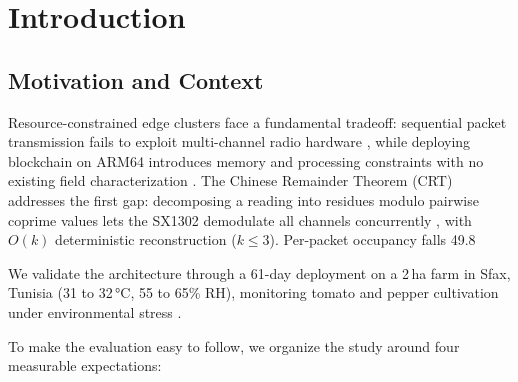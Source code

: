 \documentclass[pdflatex,sn-mathphys-num]{sn-jnl}
\theoremstyle{thmstyleone}
\theoremstyle{thmstyletwo}
\theoremstyle{thmstylethree}
\begin{document}
\maketitle

\section{Introduction}
\label{sec:introduction}

\subsection{Motivation and Context}
\label{subsec:computing_problem}

Resource-constrained edge clusters face a fundamental tradeoff: sequential packet transmission fails to exploit multi-channel radio hardware \cite{rathi2025smart, wang2025lora, chen2025compression, marcelloni2009energy}, while deploying blockchain on ARM64 introduces memory and processing constraints with no existing field characterization \cite{tar2023fabric, jayaram2023hyperledger, dube2024fabricIrrigation}. The Chinese Remainder Theorem (CRT) addresses the first gap: decomposing a reading into residues modulo pairwise coprime values lets the SX1302 demodulate all channels concurrently \cite{garner1959residue, ding1996remainder}, with $O(k)$ deterministic reconstruction ($k \leq 3$). Per-packet occupancy falls 49.8%

We validate the architecture through a 61-day deployment on a 2\,ha farm in Sfax, Tunisia (31 to 32\,°C, 55 to 65\% RH), monitoring tomato and pepper cultivation under environmental stress \cite{mohammed2025loraEnergy, raza2018lorawan, brooks2019precisionWater, williams2022savings, miller2020climateImpact}.

To make the evaluation easy to follow, we organize the study around four measurable expectations:
\end{document}
